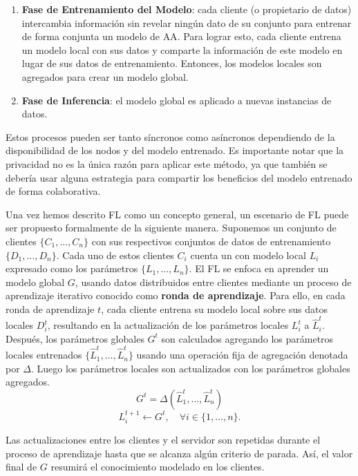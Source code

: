 \begin{enumerate}
    \item \textbf{Fase de Entrenamiento del Modelo}: cada cliente (o propietario de datos) intercambia información sin revelar ningún dato de su conjunto para entrenar de forma conjunta un modelo de \ac{AA}. Para lograr esto, cada cliente entrena un modelo local con sus datos y comparte la información de este modelo en lugar de sus datos de entrenamiento. Entonces, los modelos locales son agregados para crear un modelo global.
    \item \textbf{Fase de Inferencia}: el modelo global es aplicado a nuevas instancias de datos.
\end{enumerate}

Estos procesos pueden ser tanto síncronos como asíncronos dependiendo de la disponibilidad de los nodos y del modelo entrenado. Es importante notar que la privacidad no es la única razón para aplicar este método, ya que también se debería usar alguna estrategia para compartir los beneficios del modelo entrenado de forma colaborativa.

Una vez hemos descrito \ac{FL} como un concepto general, un escenario de \ac{FL} puede ser propuesto formalmente de la siguiente manera. Suponemos un conjunto de clientes $\{C_1, \ldots, C_n\}$ con sus respectivos conjuntos de datos de entrenamiento $\{D_1, \ldots, D_n\}$. Cada uno de estos clientes $C_i$ cuenta un con modelo local $L_i$ expresado como los parámetros $\{L_1, \ldots, L_n\}$. El \ac{FL} se enfoca en aprender un modelo global $G$, usando datos distribuidos entre clientes mediante un proceso de aprendizaje iterativo conocido como \textbf{ronda de aprendizaje}. Para ello, en cada ronda de aprendizaje $t$, cada cliente entrena su modelo local sobre sus datos locales $D_i^t$, resultando en la actualización de los parámetros locales $L_i^t$ a $\hat{L}_i^t$. Después, los parámetros globales $G^t$ son calculados agregando los parámetros locales entrenados $\{\hat{L}_1^t, \ldots, \hat{L}_n^t\}$ usando una operación fija de agregación denotada por $\Delta$. Luego los parámetros locales son actualizados con los parámetros globales agregados.
\begin{equation}
    G^t = \Delta (\hat{L}_1^t, \ldots, \hat{L}_n^t)
\end{equation}
\begin{equation}
    L^{t+1}_i \leftarrow G^t, \quad \forall i \in \{1, \ldots, n\}.
\end{equation}

Las actualizaciones entre los clientes y el servidor son repetidas durante el proceso de aprendizaje hasta que se alcanza algún criterio de parada. Así, el valor final de $G$ resumirá el conocimiento modelado en los clientes.

